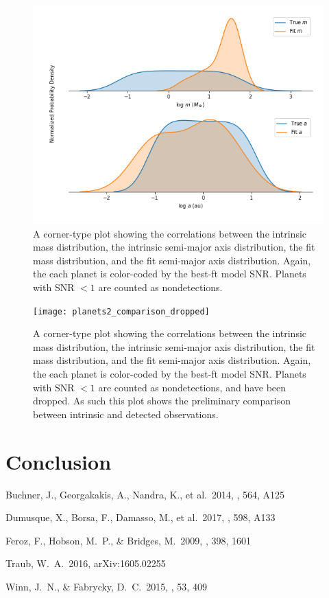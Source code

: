 \documentclass[12pt,manuscript]{aastex}
\begin{document}
\begin{figure}[h]
  \centering
  \includegraphics[width=0.9\linewidth]{planets2_comparison}
  \caption{A corner-type plot showing the correlations between the intrinsic mass distribution, the intrinsic semi-major axis distribution, the fit mass distribution, and the fit semi-major axis distribution. Again, the each planet is color-coded by the best-ft model SNR. Planets with SNR $< 1$ are counted as nondetections.}
  \label{}
\end{figure}

\begin{figure}[h]
  \centering
  \texttt{[image: planets2\_comparison\_dropped]}
  \caption{A corner-type plot showing the correlations between the intrinsic mass distribution, the intrinsic semi-major axis distribution, the fit mass distribution, and the fit semi-major axis distribution. Again, the each planet is color-coded by the best-ft model SNR. Planets with SNR $< 1$ are counted as nondetections, and have been dropped. As such this plot shows the preliminary comparison between intrinsic and detected observations.}
  \label{}
\end{figure}

\section{Conclusion}
\label{section: conclusion}

\begin{thebibliography}{}

 Buchner, J., Georgakakis, A., Nandra, K., et al.\ 2014, \aap, 564, A125

 Dumusque, X., Borsa, F., Damasso, M., et al.\ 2017, \aap, 598, A133 

 Feroz, F., Hobson, M.~P., \& Bridges, M.\ 2009, \mnras, 398, 1601 

 Traub, W.~A.\ 2016, arXiv:1605.02255 

 Winn, J.~N., \& Fabrycky, D.~C.\ 2015, \araa, 53, 409 

\end{thebibliography}

 
\end{document}
